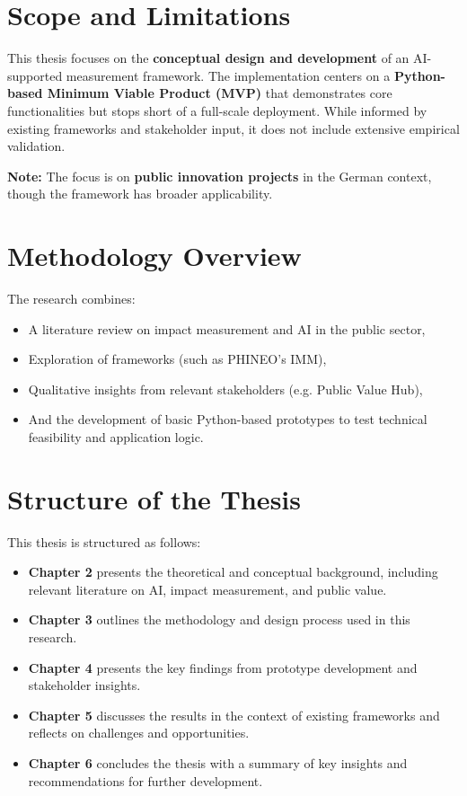 \section{Scope and Limitations}\label{sec:scope-and-limitations}

This thesis focuses on the \textbf{conceptual design and development} of an AI-supported measurement framework.
The implementation centers on a \textbf{Python-based Minimum Viable Product (MVP)} that demonstrates core functionalities but stops short of a full-scale deployment.
While informed by existing frameworks and stakeholder input, it does not include extensive empirical validation.

\medskip
\noindent\textbf{Note:} The focus is on \textbf{public innovation projects} in the German context, though the framework has broader applicability.
\medskip

\section{Methodology Overview}\label{sec:methodology-overview}

The research combines:
\begin{itemize}
\item
A literature review on impact measurement and AI in the public sector,
\item
Exploration of frameworks (such as PHINEO’s IMM),
\item
Qualitative insights from relevant stakeholders (e.g. Public Value Hub),
\item
And the development of basic Python-based prototypes to test technical feasibility and application logic.
\end{itemize}

\section{Structure of the Thesis}\label{sec:structure-of-the-thesis}

This thesis is structured as follows:

\begin{itemize}
\item
\textbf{Chapter 2} presents the theoretical and conceptual background, including relevant literature on AI, impact measurement, and public value.
\item
\textbf{Chapter 3} outlines the methodology and design process used in this research.
\item
\textbf{Chapter 4} presents the key findings from prototype development and stakeholder insights.
\item
\textbf{Chapter 5} discusses the results in the context of existing frameworks and reflects on challenges and opportunities.
\item
\textbf{Chapter 6} concludes the thesis with a summary of key insights and recommendations for further development.
\end{itemize}
